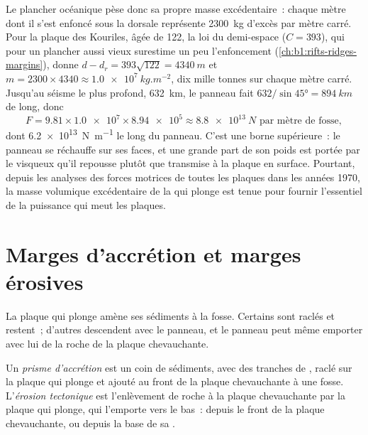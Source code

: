 Le plancher océanique pèse donc sa propre masse excédentaire~: chaque mètre dont il s'est enfoncé
sous la dorsale représente \qty{2300}{kg} d'excès par mètre carré. Pour la
plaque des Kouriles, âgée de \qty{122}{\Ma}, la loi du demi-espace ($C = 393$), qui pour un plancher
aussi vieux surestime un peu l'enfoncement (\cref{ch:b1:rifts-ridges-margins}),
donne $d - d_r = 393\sqrt{122} = \qty{4340}{m}$ et
$m = 2300\times4340 \approx \qty{1.0e7}{kg.m^{-2}}$, dix mille tonnes sur chaque mètre
carré. Jusqu'au séisme le plus profond, \qty{632}{km}, le panneau fait
$632/\sin\ang{45} = \qty{894}{km}$ de long, donc
\[
  F = 9.81 \times \num{1.0e7} \times \num{8.94e5} \approx \qty{8.8e13}{N}
  \text{ par mètre de fosse},
\]
dont \qty{6.2e13}{N.m^{-1}} le long du panneau. C'est une borne supérieure~: le panneau
se réchauffe sur ses faces, et une grande part de son poids est portée par le  visqueux qu'il
repousse plutôt que transmise à la plaque en surface. Pourtant, depuis les
analyses des forces motrices de toutes les plaques dans les années 1970, la masse
volumique excédentaire de la  qui plonge est tenue pour fournir l'essentiel de la puissance qui
meut les plaques.

\section{Marges d'accrétion et marges érosives}\label{sec:b1:active-margins:prisms}

La plaque qui plonge amène ses sédiments à la fosse. Certains sont raclés et
restent~; d'autres descendent avec le panneau, et le panneau peut même emporter avec lui de la roche
de la plaque chevauchante.

\begin{definition}\label{def:b1:active-margins:accretionary}
Un \emph{prisme d'accrétion} est un coin de sédiments,
avec des tranches de , raclé sur la plaque qui plonge et ajouté au
front de la plaque chevauchante à une fosse. L'\emph{érosion
tectonique} est l'enlèvement de roche à la plaque
chevauchante par la plaque qui plonge, qui l'emporte vers le bas~: depuis le front de la
plaque chevauchante, ou depuis la base de sa .
\end{definition}


